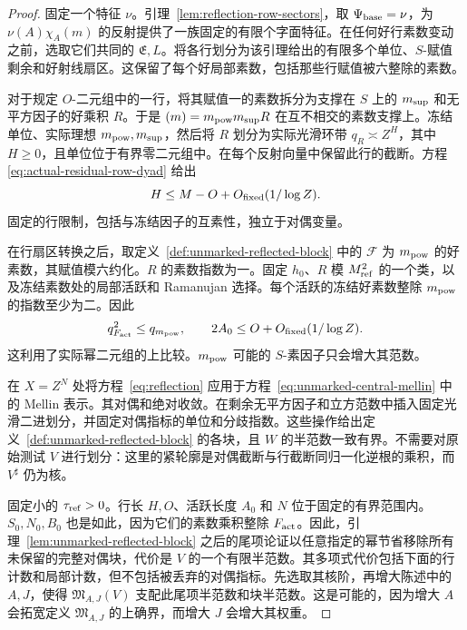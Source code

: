 \documentclass[11pt,a4paper]{article}
\numberwithin{equation}{section}
\numberwithin{figure}{section}
\theoremstyle{definition}
\theoremstyle{remark}
\begin{document}
\begin{proof}
固定一个特征 $\nu$。引理~\ref{lem:reflection-row-sectors}，取 $\Psi_{\rm base}=\nu$，为 $\nu(A)\chi_A(m)$ 的反射提供了一族固定的有限个字面特征。在任何好行素数变动之前，选取它们共同的 $\mathfrak E,L$。将各行划分为该引理给出的有限多个单位、$S$-赋值剩余和好射线扇区。这保留了每个好局部素数，包括那些行赋值被六整除的素数。

对于规定 $O$-二元组中的一行，将其赋值一的素数拆分为支撑在 $S$ 上的 $m_{\rm sup}$ 和无平方因子的好乘积 $R$。于是 $(m)=m_{\rm pow}m_{\rm sup}R$ 在互不相交的素数支撑上。冻结单位、实际理想 $m_{\rm pow},m_{\rm sup}$，然后将 $R$ 划分为实际光滑环带 $q_R\asymp Z^H$，其中 $H\ge0$，且单位位于有界零二元组中。在每个反射向量中保留此行的截断。方程 \eqref{eq:actual-residual-row-dyad} 给出
\begin{equation}\label{eq:unmarked-row-width}
 H\le M-O+O_{\rm fixed}(1/\log Z).
\end{equation}
固定的行限制，包括与冻结因子的互素性，独立于对偶变量。

在行扇区转换之后，取定义~\ref{def:unmarked-reflected-block} 中的 $\mathcal F$ 为 $m_{\rm pow}$ 的好素数，其赋值模六约化。$R$ 的素数指数为一。固定 $h_0$、$R$ 模 $M_{\rm ref}^2$ 的一个类，以及冻结素数处的局部活跃和 Ramanujan 选择。每个活跃的冻结好素数整除 $m_{\rm pow}$ 的指数至少为二。因此
\begin{equation}\label{eq:unmarked-powerful-radical}
 q_{F_{\rm act}}^2\le q_{m_{\rm pow}},\qquad
 2A_0\le O+O_{\rm fixed}(1/\log Z).
\end{equation}
这利用了实际幂二元组的上比较。$m_{\rm pow}$ 可能的 $S$-素因子只会增大其范数。

在 $X=Z^N$ 处将方程~\eqref{eq:reflection} 应用于方程~\eqref{eq:unmarked-central-mellin} 中的 Mellin 表示。其对偶和绝对收敛。在剩余无平方因子和立方范数中插入固定光滑二进划分，并固定对偶指标的单位和分歧指数。这些操作给出定义~\ref{def:unmarked-reflected-block} 的各块，且 $W$ 的半范数一致有界。不需要对原始测试 $V$ 进行划分：这里的紧轮廓是对偶截断与行截断同归一化逆根的乘积，而 $V^\sharp$ 仍为核。

固定小的 $\tau_{\rm ref}>0$。行长 $H,O$、活跃长度 $A_0$ 和 $N$ 位于固定的有界范围内。$S_0,N_0,B_0$ 也是如此，因为它们的素数乘积整除 $F_{\rm act}$。因此，引理~\ref{lem:unmarked-reflected-block} 之后的尾项论证以任意指定的幂节省移除所有未保留的完整对偶块，代价是 $V$ 的一个有限半范数。其多项式代价包括下面的行计数和局部计数，但不包括被丢弃的对偶指标。先选取其核阶，再增大陈述中的 $A,J$，使得 $\mathfrak M_{A,J}(V)$ 支配此尾项半范数和块半范数。这是可能的，因为增大 $A$ 会拓宽定义 $\mathfrak M_{A,J}$ 的上确界，而增大 $J$ 会增大其权重。


\end{proof}
\end{document}
